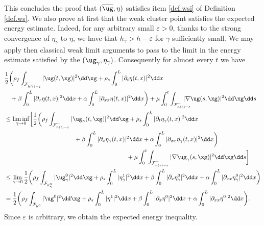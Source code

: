 This concludes the proof that $(\overline{\ug},\eta)$ satisfies item \eqref{def.wsi} of Definition
\ref{def.ws}.
We also prove at first that the weak cluster point
satisfies the expected energy estimate. Indeed, for any arbitrary small $\varepsilon >0$, thanks to the strong convergence of $\eta_{\gamma}$ to $\eta$, we have that $h_{\gamma} > h- \varepsilon$ for $\gamma$ sufficiently small. We may apply then classical weak limit arguments to pass to the limit in the energy estimate satisfied by the $({\ug}_{\gamma},\eta_{\gamma})$. Consequently for almost every $t$ we have
\[
\begin{aligned}
&\frac{1}{2}\biggl(\rho_{f}\int_{\mathcal{F}^{-}_{h(t)-\varepsilon}}\vert\ug(t, \xg) \vert^{2} \dd\xg + \rho_{s}\int_{0}^{L}\vert\partial_{t}\eta(t, x) \vert^{2} \dd x\\
& \quad +\beta\int_{0}^{L}\vert\partial_{x}\eta(t, x) \vert^{2} \dd x+\alpha\int_{0}^{L}\vert\partial_{xx}\eta(t, x) \vert^{2} \dd x\biggr)+ \mu\int_0^t\int_{\mathcal{F}^{-}_{h(s)-\varepsilon}}\hspace*{-5mm}\vert \nabla\ug(s, \xg) \vert^{2} \dd\xg\dd s \\
& \leq
\liminf_{\gamma \to 0} \biggl[ \frac{1}{2}\biggl(\rho_{f}\int_{\mathcal{F}^{-}_{h(t)-\varepsilon}}\vert\ug_{\gamma}(t, \xg) \vert^{2} \dd\xg + \rho_{s}\int_{0}^{L}\vert\partial_{t}\eta_{\gamma}(t, x) \vert^{2} \dd x \\
& \hspace*{4cm} +\beta\int_{0}^{L}\vert\partial_{x}\eta_{\gamma}(t, x) \vert^{2} \dd x +\alpha\int_{0}^{L}\vert\partial_{xx}\eta_{\gamma}(t, x) \vert^{2} \dd x \biggr) \\
& \hspace*{7cm} + \mu\int_0^t\int_{\mathcal{F}^{-}_{h(s)-\varepsilon}}\vert \nabla\ug_{\gamma}(s, \xg) \vert^{2} \dd\xg\dd s\biggr] \\
& \leq \lim_{\gamma \to 0}
\frac{1}{2}\biggl(\rho_{f}\int_{\mathcal{F}_{h^0_{\gamma}}}\vert\ug^0_{\gamma}\vert^{2} \dd \xg+ \rho_{s}\int_{0}^{L}\vert\eta^1_{\gamma}\vert^{2}\dd x+\beta\int_{0}^{L}\vert\partial_{x}\eta^0_{\gamma}\vert^{2}\dd x+\alpha\int_{0}^{L}\vert\partial_{xx}\eta^0_{\gamma}\vert^{2}\dd x\biggr)
\\
&
=\frac{1}{2}\biggl(\rho_{f}\int_{\mathcal{F}_{h^0}}\vert\ug^0\vert^{2} \dd \xg+ \rho_{s}\int_{0}^{L}\vert\eta^1\vert^{2}\dd x +\beta\int_{0}^{L}\vert\partial_{x}\eta^0\vert^{2}\dd x+\alpha\int_{0}^{L}\vert\partial_{xx}\eta^0\vert^{2}\dd x\biggr).
\end{aligned}
\]
Since $\varepsilon$ is arbitrary, we obtain the expected energy inequality.

